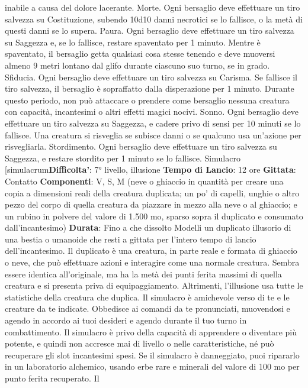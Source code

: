 \begin{multicols}{2}
inabile a causa del dolore lacerante.
Morte. Ogni bersaglio deve effettuare un tiro salvezza
su Costituzione, subendo 10d10 danni necrotici se lo
fallisce, o la metà di questi danni se lo supera.
Paura. Ogni bersaglio deve effettuare un tiro salvezza
su Saggezza e, se lo fallisce, restare spaventato per 1
minuto. Mentre è spaventato, il bersaglio getta qualsiasi
cosa stesse tenendo e deve muoversi almeno 9 metri
lontano dal glifo durante ciascuno suo turno, se in
grado.
Sfiducia. Ogni bersaglio deve effettuare un tiro
salvezza su Carisma. Se fallisce il tiro salvezza, il
bersaglio è sopraffatto dalla disperazione per 1 minuto.
Durante questo periodo, non può attaccare o prendere
come bersaglio nessuna creatura con capacità,
incantesimi o altri effetti magici nocivi.
Sonno. Ogni bersaglio deve effettuare un tiro salvezza
su Saggezza, e cadere privo di sensi per 10 minuti se lo
fallisce. Una creatura si risveglia se subisce danni o se
qualcuno usa un’azione per risvegliarla.
Stordimento. Ogni bersaglio deve effettuare un tiro
salvezza su Saggezza, e restare stordito per 1 minuto
se lo fallisce.
Simulacro
[simulacrum\textbf{Difficolta'}:
7° livello, illusione
\textbf{Tempo di Lancio}: 12 ore
\textbf{Gittata}: Contatto
\textbf{Componenti}: V, S, M (neve o ghiaccio in quantità per
creare una copia a dimensioni reali della creatura
duplicata; un po’ di capelli, unghie o altro pezzo del
corpo di quella creatura da piazzare in mezzo alla neve
o al ghiaccio; e un rubino in polvere del valore di 1.500
mo, sparso sopra il duplicato e consumato
dall’incantesimo)
\textbf{Durata}: Fino a che dissolto
Modelli un duplicato illusorio di una bestia o umanoide
che resti a gittata per l’intero tempo di lancio
dell’incantesimo. Il duplicato è una creatura, in parte
reale e formata di ghiaccio o neve, che può effettuare
azioni e interagire come una normale creatura. Sembra
essere identica all’originale, ma ha la metà dei punti
ferita massimi di quella creatura e si presenta priva di
equipaggiamento. Altrimenti, l’illusione usa tutte le
statistiche della creatura che duplica.
Il simulacro è amichevole verso di te e le creature da te
indicate. Obbedisce ai comandi da te pronunciati,
muovendosi e agendo in accordo ai tuoi desideri e
agendo durante il tuo turno in combattimento. Il
simulacro è privo della capacità di apprendere o
diventare più potente, e quindi non accresce mai di
livello o nelle caratteristiche, né può recuperare gli slot
incantesimi spesi.
Se il simulacro è danneggiato, puoi ripararlo in un
laboratorio alchemico, usando erbe rare e minerali del
valore di 100 mo per punto ferita recuperato. Il

\end{multicols}

